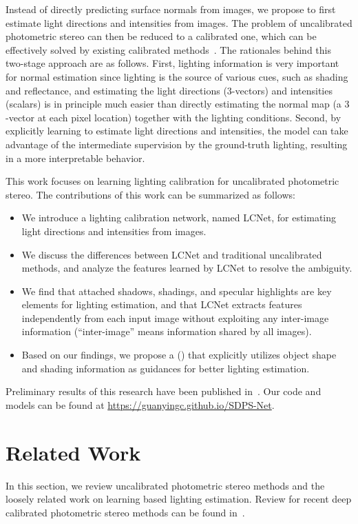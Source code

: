 Instead of directly predicting surface normals from images, we propose to first estimate light directions and intensities from images. The problem of uncalibrated photometric stereo can then be reduced to a calibrated one, which can be effectively solved by existing calibrated methods~\cite{shi2014bi,chen2018ps,ikehata2018cnn}.
The rationales behind this two-stage approach are as follows. First, lighting information is very important for normal estimation since lighting is the source of various cues, such as shading and reflectance, and estimating the light directions ($3$-vectors) and intensities (scalars) is in principle much easier than directly estimating the normal map (a $3$-vector at each pixel location) together with the lighting conditions. 
Second, by explicitly learning to estimate light directions and intensities, the model can take advantage of the intermediate supervision by the ground-truth lighting, resulting in a more interpretable behavior. 

This work focuses on learning lighting calibration for uncalibrated photometric stereo. The contributions of this work can be summarized as follows:
\begin{itemize}
    \item We introduce a lighting calibration network, named LCNet, for estimating light directions and intensities from images.
    \item We discuss the differences between LCNet and traditional uncalibrated methods, and analyze the features learned by LCNet to resolve the \gbr ambiguity.
    \item We find that attached shadows, shadings, and specular highlights are key elements for lighting estimation, and that LCNet extracts features independently from each input image without exploiting any inter-image information (``inter-image'' means information shared by all images).
    \item Based on our findings, we propose a \gcnetname (\gcnetacronym) that explicitly utilizes object shape and shading information as guidances for better lighting estimation.
\end{itemize}

Preliminary results of this research have been published in~\cite{chen2019self,chen2020chen_gcnet}.
Our code and models can be found at \url{https://guanyingc.github.io/SDPS-Net}.

\section{Related Work}
\label{sec:lcnet_relatedwork}
In this section, we review uncalibrated photometric stereo methods and the loosely related work on learning based lighting estimation. Review for recent deep calibrated photometric stereo methods can be found in~.

